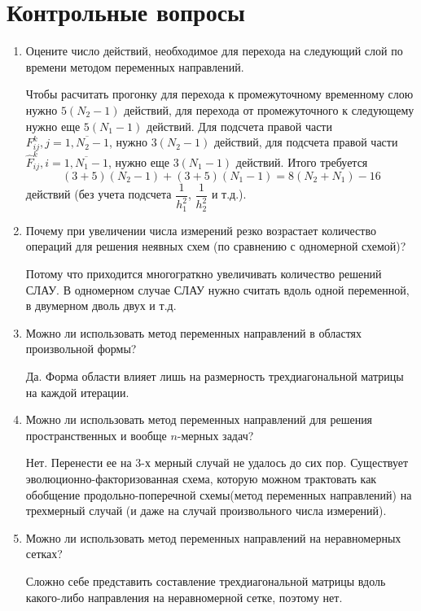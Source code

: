 \documentclass[12pt, a4paper]{article}
\begin{document}
\section{Контрольные вопросы}
\begin{enumerate}
\item Оцените число действий, необходимое для перехода на следующий слой по времени методом переменных направлений.

Чтобы расчитать прогонку для перехода к промежуточному временному слою нужно $5(N_2-1)$ действий, для перехода от промежуточного к следующему нужно еще $5(N_1-1)$ действий. Для подсчета правой части $F_{ij}^k, j = \overline{1,N_2-1}$, нужно $3(N_2 - 1)$ действий, для подсчета правой части $\hat{F}_{ij}^k, i = \overline{1,N_1-1}$, нужно еще $3(N_1 - 1)$ действий. Итого требуется
\[
(3 + 5)(N_2-1) + (3 + 5)(N_1-1) = 8(N_2 + N_1) - 16
\]
действий (без учета подсчета $\dfrac{1}{h_1^2}$, $\dfrac{1}{h_2^2}$ и т.д.).

\item Почему при увеличении числа измерений резко возрастает количество операций для решения неявных схем (по сравнению с одномерной схемой)?

Потому что приходится многограткно увеличивать количество решений СЛАУ. В одномерном случае СЛАУ нужно считать вдоль одной переменной, в двумерном дволь двух и т.д.

\item Можно ли использовать метод переменных направлений в
областях произвольной формы?

Да. Форма области влияет лишь на размерность трехдиагональной матрицы на каждой итерации. 


\item Можно ли использовать метод переменных направлений для решения пространственных и вообще $n$-мерных задач?

Нет. Перенести ее на 3-х мерный случай не удалось до сих пор. Существует эволюционно-факторизованная схема, которую можном трактовать как обобщение продольно-поперечной схемы(метод переменных направлений) на трехмерный случай (и даже на случай произвольного числа измерений).

\item Можно ли использовать метод переменных направлений на неравномерных сетках?

Сложно себе представить составление трехдиагональной матрицы вдоль какого-либо направления на неравномерной сетке, поэтому нет.
\end{enumerate}


\newpage
\end{document}
